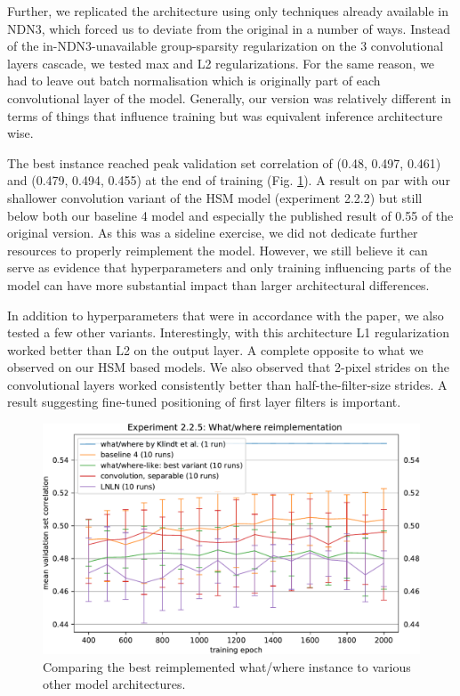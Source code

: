 Further, we replicated the architecture using only techniques already available in NDN3, which forced us to deviate from the original in a number of ways. Instead of the in-NDN3-unavailable group-sparsity regularization on the 3 convolutional layers cascade, we tested max and L2 regularizations. For the same reason, we had to leave out batch normalisation which is originally part of each convolutional layer of the model. Generally, our version was relatively different in terms of things that influence training but was equivalent inference architecture wise.

The best instance reached peak validation set correlation of (0.48, 0.497, 0.461) and (0.479, 0.494, 0.455) at the end of training (Fig. \ref{fig:5.2.2.5}). A result on par with our shallower convolution variant of the HSM model (experiment 2.2.2) but still below both our baseline 4 model and especially the published result of 0.55 of the original \citeauthor{klindt} version. As this was a sideline exercise, we did not dedicate further resources to properly reimplement the model. However, we still believe it can serve as evidence that hyperparameters and only training influencing parts of the model can have more substantial impact than larger architectural differences.

In addition to hyperparameters that were in accordance with the paper, we also tested a few other variants. Interestingly, with this architecture L1 regularization worked better than L2 on the output layer. A complete opposite to what we observed on our HSM based models. We also observed that 2-pixel strides on the convolutional layers worked consistently better than half-the-filter-size strides. A result suggesting fine-tuned positioning of first layer filters is important.

\begin{figure}[H]
    \centering
    \includegraphics[width=1\textwidth]{../figures/05_2_2_5}
    \caption[Experiment 2.2.5]{Comparing the best reimplemented what/where instance to various other model architectures.}
    \label{fig:5.2.2.5}
\end{figure}

